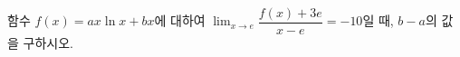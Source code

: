 함수 $f(x)=ax\ln x+bx$에 대하여 $\displaystyle\lim_{x\to e}\dfrac{f(x)+3e}{x-e}=-10$일 때, $b-a$의 값을 구하시오. 
